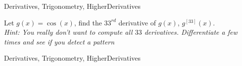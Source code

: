 \begin{tagblock}{Derivatives, Trigonometry, HigherDerivatives}
\begin{question}
	






Let $g(x) = \cos(x)$, find the $33^{rd}$ derivative of $g(x)$, $g^{[33]}(x)$.   \\ \emph{Hint: You really don't want to compute all $33$ derivatives.  Differentiate a few times and see if you detect a pattern}



	
\begin{tags}
	    Derivatives, Trigonometry, HigherDerivatives
\end{tags}
	
\begin{diary}
\end{diary}
	
\begin{solution}
	   
\end{solution}
	
\end{question}

\end{tagblock}




